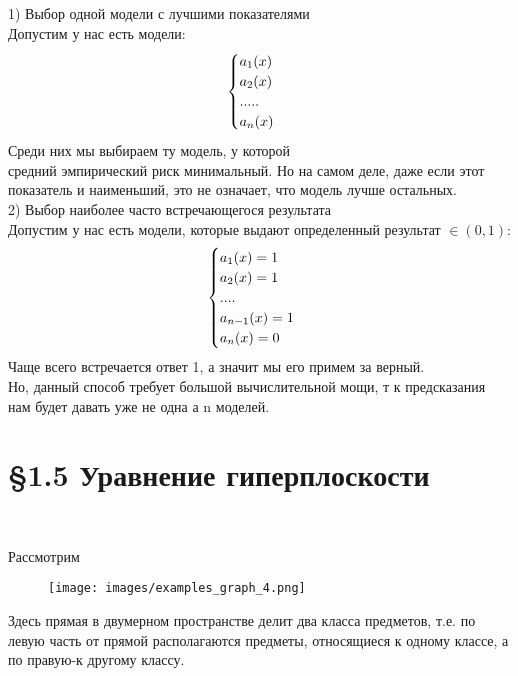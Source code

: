 1) \(\textbf{Выбор одной модели с лучшими показателями}\) \\
\vspace{0.3cm}
Допустим у нас есть модели: \\
\[
    \begin{cases}
    a_1(x) \\
    a_2(x) \\
    .... . \\
    a_n(x)
\end{cases} \\
\]
Среди них мы выбираем ту модель, у которой \(\textbf{средний эмпирический риск минимальный}\).
Но на самом деле, даже если этот показатель и наименьший, это не означает, что модель лучше остальных. \\
\vspace{0.3cm}
2) \(\textbf{Выбор наиболее часто встречающегося результата}\) \\
\vspace{0.3cm}
Допустим у нас есть модели, которые выдают определенный результат \(\in (0, 1)\): \\
\[
    \begin{cases}
    a_1(x) = 1 \\
    a_2(x) = 1 \\
    .... \\
    a_{n-1}(x) = 1 \\
    a_n(x) = 0
\end{cases} \\
\]
Чаще всего встречается ответ 1, а значит мы его примем за верный. \\
Но, данный способ \(\textbf{требует большой вычислительной мощи}\),
т к предсказания нам будет давать уже не одна а n моделей. \\

\newpage
\centering
\section*{\S 1.5 Уравнение гиперплоскости} \\
\vspace{0.8cm}
\raggedright
Рассмотрим
\begin{figure}[htbp]
        \centering
        \texttt{[image: images/examples\_graph\_4.png]}
        \label{fig:example_4}
\end{figure}
Здесь прямая в двумерном пространстве делит два класса предметов, т.е. по левую часть от прямой располагаются предметы,
относящиеся к одному классе, а по правую-к другому классу. \\
\vspace{0.5cm}

